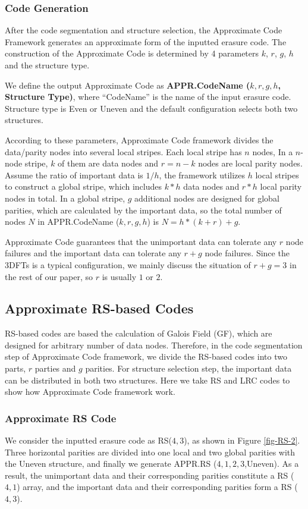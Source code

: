 \documentclass[sigconf]{acmart}
\begin{document}
\subsubsection{Code Generation}\label{code-gen}
After the code segmentation and structure selection, the Approximate Code Framework generates an approximate form of the inputted erasure code.
The construction of the Approximate Code is determined by 4 parameters $k$, $r$, $g$, $h$ and the structure type.

We define the output Approximate Code as \textbf{APPR.CodeName ($k,r,g,h$, Structure Type)}, where ``CodeName'' is the name of the input erasure code. Structure type is Even or Uneven and the default configuration selects both two structures.

According to these parameters, Approximate Code framework divides the data/parity nodes into several local stripes. Each local stripe has $n$ nodes,  
In a $n$-node stripe, $k$ of them are data nodes and $r=n-k$ nodes are local parity nodes.
Assume the ratio of important data is $1/h$, the framework utilizes $h$ local stripes to construct a global stripe, which includes $k*h$ data nodes and $r*h$ local parity nodes in total.
In a global stripe, $g$ additional nodes are designed for global parities, which are calculated by the important data, so the total number of nodes $N$ in APPR.CodeName ($k,r,g,h$) is
$N= h*(k+r) + g$.

Approximate Code guarantees that the unimportant data can tolerate any $r$ node failures and the important data can tolerate any $r+g$ node failures.
Since the 3DFTs is a typical configuration, we mainly discuss the situation of $r+g=3$ in the rest of our paper, so $r$ is usually $1$ or $2$.%

\subsection{Approximate RS-based Codes}\label{appr-rsbased}
RS-based codes are based the calculation of Galois Field (GF), which are designed for arbitrary number of data nodes. Therefore, in the code segmentation step of  Approximate Code framework, we divide the RS-based codes into two parts, $r$ parties and $g$ parities. For structure selection step, the important data can be distributed in both two structures. Here we take RS and LRC codes to show how Approximate Code framework work.

\subsubsection{Approximate RS Code}
We consider the inputted erasure code as RS($4,3$), as shown in Figure \ref{fig-RS-2}. Three horizontal parities are divided into one local and two global parities with the Uneven structure, and finally we generate APPR.RS ($4,1,2,3$,Uneven).
As a result, the unimportant data and their corresponding parities constitute a RS ($4,1$) array, and the important data and their corresponding parities form a RS ($4,3$).
\end{document}
